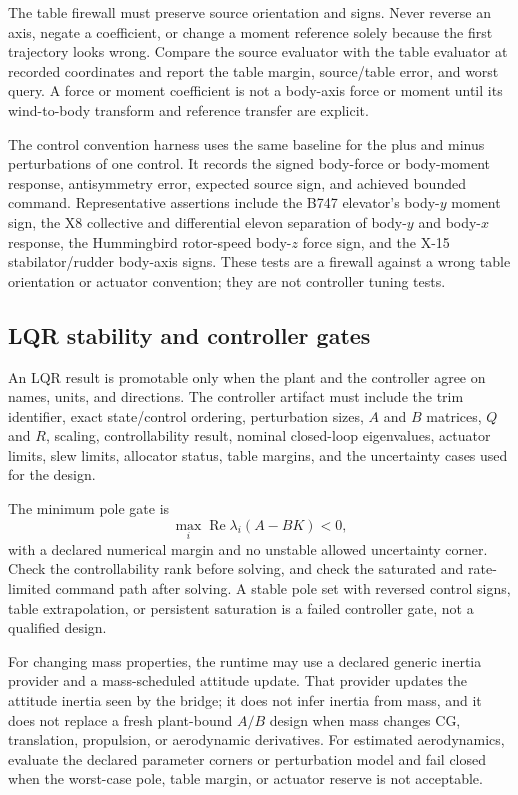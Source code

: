 \documentclass[11pt]{article}
\begin{document}
The table firewall must preserve source orientation and signs. Never reverse an
axis, negate a coefficient, or change a moment reference solely because the
first trajectory looks wrong. Compare the source evaluator with the table
evaluator at recorded coordinates and report the table margin, source/table
error, and worst query. A force or moment coefficient is not a body-axis force
or moment until its wind-to-body transform and reference transfer are explicit.

The control convention harness uses the same baseline for the plus and minus
perturbations of one control. It records the signed body-force or body-moment
response, antisymmetry error, expected source sign, and achieved bounded
command. Representative assertions include the B747 elevator's body-$y$
moment sign, the X8 collective and differential elevon separation of body-$y$
and body-$x$ response, the Hummingbird rotor-speed body-$z$ force sign, and the
X-15 stabilator/rudder body-axis signs. These tests are a firewall against a
wrong table orientation or actuator convention; they are not controller tuning
tests.

\subsection{LQR stability and controller gates}

An LQR result is promotable only when the plant and the controller agree on
names, units, and directions. The controller artifact must include the trim
identifier, exact state/control ordering, perturbation sizes, $A$ and $B$
matrices, $Q$ and $R$, scaling, controllability result, nominal closed-loop
eigenvalues, actuator limits, slew limits, allocator status, table margins,
and the uncertainty cases used for the design.

The minimum pole gate is
\[
  \max_i \operatorname{Re}\lambda_i(A-BK)<0,
\]
with a declared numerical margin and no unstable allowed uncertainty corner.
Check the controllability rank before solving, and check the saturated and
rate-limited command path after solving. A stable pole set with reversed
control signs, table extrapolation, or persistent saturation is a failed
controller gate, not a qualified design.

For changing mass properties, the runtime may use a declared generic inertia
provider and a mass-scheduled attitude update. That provider updates the
attitude inertia seen by the bridge; it does not infer inertia from mass, and it
does not replace a fresh plant-bound $A/B$ design when mass changes CG,
translation, propulsion, or aerodynamic derivatives. For estimated
aerodynamics, evaluate the declared parameter corners or perturbation model
and fail closed when the worst-case pole, table margin, or actuator reserve is
not acceptable.
\end{document}
